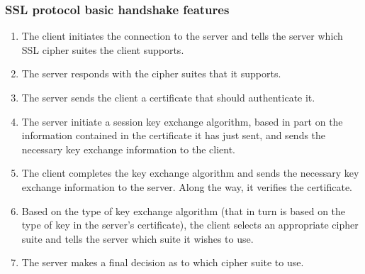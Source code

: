 \documentclass[10pt]{article}
\begin{document}
\subsubsection{SSL protocol basic handshake features}
\begin{enumerate}
	\item The client initiates the connection to the server and tells the server which SSL cipher suites the client supports.
	\item The server responds with the cipher suites that it supports.
	\item The server sends the client a certificate that should authenticate it.
	\item The server initiate a session key exchange algorithm, based in part on the information contained in the certificate it has just sent, and sends the necessary key exchange information to the client.
	\item The client completes the key exchange algorithm and sends the necessary key exchange information to the server. Along the way, it verifies the certificate.
	\item Based on the type of key exchange algorithm (that in turn is based on the type of key in the server’s certificate), the client selects an appropriate cipher suite and tells the server which suite it wishes to use.
	\item The server makes a final decision as to which cipher suite to use.
\end{enumerate}
\end{document}
